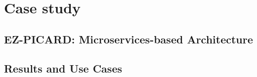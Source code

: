 \section{Case study}

\subsection{EZ-PICARD: Microservices-based Architecture}

\subsection{Results and Use Cases}